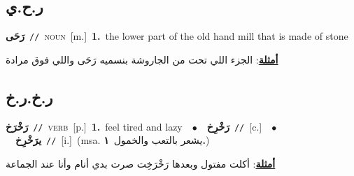 \documentclass[10pt,a4paper,twoside]{article} %
\begin{document}
\begin{multicols}{2}
\vspace{-3mm}
\subsection*{\color{blue}\foreignlanguage{arabic}{ر.ح.ي}\color{blue}{}} 

{\setlength\topsep{0pt}\textbf{\foreignlanguage{arabic}{رَحَى}}\ {\color{gray}\texttt{//}\color{black}}\ \textsc{noun}\ [m.]\ \textbf{1.}~the lower part of the old hand mill that is made of stone\  \begin{flushright}\color{gray}\foreignlanguage{arabic}{\textbf{\underline{\foreignlanguage{arabic}{أمثلة}}}: الجزء اللي تحت من الجاروشة بنسميه رَحَى واللي فوق مرادة}\end{flushright}\color{black}} \vspace{2mm}

\vspace{-3mm}
\subsection*{\color{blue}\foreignlanguage{arabic}{ر.خ.ر.خ}\color{blue}{}} 

{\setlength\topsep{0pt}\textbf{\foreignlanguage{arabic}{رَخْرَخ}}\ {\color{gray}\texttt{//}\color{black}}\ \textsc{verb}\ [p.]\ \textbf{1.}~feel tired and lazy\ \ $\bullet$\ \ \setlength\topsep{0pt}\textbf{\foreignlanguage{arabic}{رَخْرِخ}}\ {\color{gray}\texttt{//}\color{black}}\ [c.]\ \ $\bullet$\ \ \setlength\topsep{0pt}\textbf{\foreignlanguage{arabic}{يرَخْرِخ}}\ {\color{gray}\texttt{//}\color{black}}\ [i.]\ \color{gray}(msa. \foreignlanguage{arabic}{يشعر بالتعب والخمول}~\foreignlanguage{arabic}{\textbf{١.}})\color{black}\  \begin{flushright}\color{gray}\foreignlanguage{arabic}{\textbf{\underline{\foreignlanguage{arabic}{أمثلة}}}: أكلت مفتول وبعدها رَخْرَخِت صرت بدي أنام وأنا عند الجماعة}\end{flushright}\color{black}} \vspace{2mm}


\end{multicols}
\end{document}
